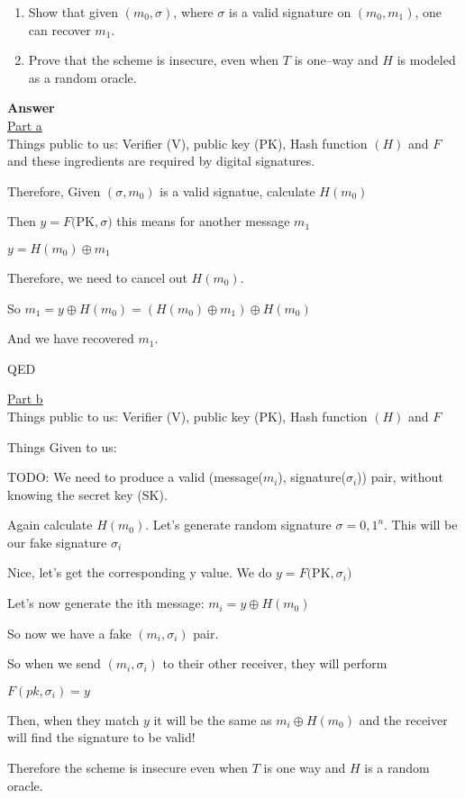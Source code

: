\documentclass[12pt]{article}
\newcommand{\xor}{\oplus}
\begin{document}
\begin{enumerate}[label=\arabic*.]
    \item Show that given $(m_0, \sigma)$, where $\sigma$ is a valid signature on $(m_0,m_1)$, one can recover $m_1$.
    \item Prove that the scheme is insecure, even when $T$ is one–way and $H$ is modeled as a random oracle.
\end{enumerate}

\textbf{Answer}
\\
\underline{Part a}
\\
Things public to us:
Verifier (V), public key (PK), Hash function $(H)$ and $F$ and these 
ingredients are required by digital signatures.

Therefore, 
Given $(\sigma, m_0)$ is a valid signatue, calculate $H(m_0)$

Then $y = F($PK$, \sigma)$ this means for another message $m_1$

$y = H(m_0) \xor {m_1}$

Therefore, we need to cancel out $H(m_0)$.

So $m_1 = y \xor H(m_0) = ( H(m_0) \xor {m_1}) \xor H(m_0) $

And we have recovered $m_1$.

QED

\underline{Part b}
\\
Things public to us:
Verifier (V), public key (PK), Hash function $(H)$ and $F$

Things Given to us:

TODO: 
We need to produce a valid (message($m_i$), signature($\sigma_i$)) pair, 
without knowing the secret key (SK).

Again calculate $H(m_0)$. 
Let's generate random signature $\sigma = {0,1}^n$. This will be our fake signature $\sigma_i$

Nice, let's get the corresponding y value. We do $y = F($PK$, \sigma_i)$

Let's now generate the ith message: $m_i = y \xor H(m_0)$

So now we have a fake $(m_i, \sigma_i)$ pair. 

So when we send $(m_i, \sigma_i)$ to their other receiver, they will perform

$F(pk, \sigma_i) = y$

Then, when they match $y$ it will be the same as  $m_i \xor H(m_0)$ 
and the receiver will find the signature to be valid!

Therefore the scheme is insecure even when $T$ is one way and $H$ is a random oracle.
\end{document}

